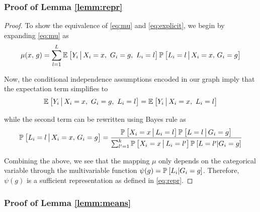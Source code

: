 \documentclass{article}
\theoremstyle{plain}
\theoremstyle{definition}
\theoremstyle{remark}
\begin{document}
\subsubsection{Proof of Lemma \ref{lemm:repr}}

\begin{proof} \label{proof:suff}
To show the equivalence of \eqref{eq:mu} and \eqref{eq:explicit}, we begin by expanding \eqref{eq:mu} as
\begin{equation}
\mu(x, \, g)= \sum_{l=1}^L \mathbb{E}_{}\left[Y_i \,\big|\, X_i = x, \ G_{i} = g, \ L_i = l\right] \mathbb{P}_{}\left[L_i = l \,\big|\, X_i = x, \, G_i=g\right]
\label{eq:mu2}
\end{equation}

Now, the conditional independence assumptions encoded in our graph imply that the expectation term simplifies to
\begin{equation}
\mathbb{E}_{}\left[Y_i \,\big|\, X_i = x, \ G_{i} = g, \ L_i = l\right] = \mathbb{E}_{}\left[Y_i \,\big|\, X_i = x, \ L_i = l\right]
\end{equation}

while the second term can be rewritten using Bayes rule as
\begin{equation}
\mathbb{P}_{}\left[L_i = l \,\big|\, X_i = x, \, G_i=g\right] = \frac{ \mathbb{P}_{}\left[X_{i}=x \,\big|\, L_{i}=l\right] \mathbb{P}_{}\left[L=l \,\big|\, G_{i}=g\right]  }
       {\sum_{l'=1}^{k} \mathbb{P}_{}\left[X_{i}=x \,\big|\, L_{i}=l'\right] \mathbb{P}_{}\left[L=l' | G_{i}=g\right] }
\end{equation}

Combining the above, we see that the mapping $\mu$ only depends on the categorical variable through the multivariable function $\psi(g) = \mathbb{P}_{}\left[L_{i}| G_{i}=g\right]$. Therefore, $\psi(g)$ is a sufficient representation as defined in \eqref{eq:repr}.
\end{proof}


\subsubsection{Proof of Lemma \ref{lemm:means}}
\end{document}
